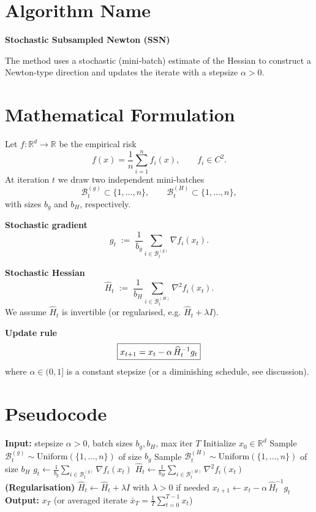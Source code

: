 \documentclass{article}
\newcommand{\R}{\mathbb{R}}
\newcommand{\grad}{\nabla}
\begin{document}
\section*{Algorithm Name}
\textbf{Stochastic Subsampled Newton (SSN)}  

The method uses a stochastic (mini‑batch) estimate of the Hessian to construct a Newton‑type direction and updates the iterate with a stepsize $\alpha>0$.

\section*{Mathematical Formulation}
Let $f:\R^{d}\rightarrow\R$ be the empirical risk
\[
f(x)=\frac{1}{n}\sum_{i=1}^{n} f_i(x),\qquad 
f_i\in C^{2}.
\]
At iteration $t$ we draw two independent mini‑batches 
\[
\mathcal{B}^{(g)}_{t}\subset\{1,\dots,n\},\qquad 
\mathcal{B}^{(H)}_{t}\subset\{1,\dots,n\},
\]
with sizes $b_g$ and $b_H$, respectively.  

\noindent\textbf{Stochastic gradient}
\[
g_t\;:=\;\frac{1}{b_g}\sum_{i\in\mathcal{B}^{(g)}_{t}} \grad f_i(x_t).
\]

\noindent\textbf{Stochastic Hessian}
\[
\widehat H_t\;:=\;\frac{1}{b_H}\sum_{i\in\mathcal{B}^{(H)}_{t}} \grad^{2} f_i(x_t).
\]
We assume $\widehat H_t$ is invertible (or regularised, e.g. $\widehat H_t+\lambda I$).  

\noindent\textbf{Update rule}
\begin{equation}
\boxed{%
x_{t+1}=x_t-\alpha\,\widehat H_t^{-1} g_t
}\label{eq:update}
\end{equation}
where $\alpha\in(0,1]$ is a constant stepsize (or a diminishing schedule, see discussion).

\section*{Pseudocode}
\begin{algorithm}[H]
\caption{Stochastic Subsampled Newton (SSN)}\label{alg:ssn}
\begin{algorithmic}[1]
\State \textbf{Input:} stepsize $\alpha>0$, batch sizes $b_g,b_H$, max iter $T$
\State Initialize $x_0\in\R^{d}$
    \State Sample $\mathcal{B}^{(g)}_{t}\sim\text{Uniform}(\{1,\dots,n\})$ of size $b_g$
    \State Sample $\mathcal{B}^{(H)}_{t}\sim\text{Uniform}(\{1,\dots,n\})$ of size $b_H$
    \State $g_t\gets\frac{1}{b_g}\sum_{i\in\mathcal{B}^{(g)}_{t}}\grad f_i(x_t)$
    \State $\widehat H_t\gets\frac{1}{b_H}\sum_{i\in\mathcal{B}^{(H)}_{t}}\grad^{2} f_i(x_t)$
    \State \textbf{(Regularisation)} $\widehat H_t\gets\widehat H_t+\lambda I$ with $\lambda>0$ if needed
    \State $x_{t+1}\gets x_t-\alpha\,\widehat H_t^{-1} g_t$
\EndFor
\State \textbf{Output:} $x_T$ (or averaged iterate $\bar x_T=\frac1T\sum_{t=0}^{T-1}x_t$)
\end{algorithmic}
\end{algorithm}
\end{document}
